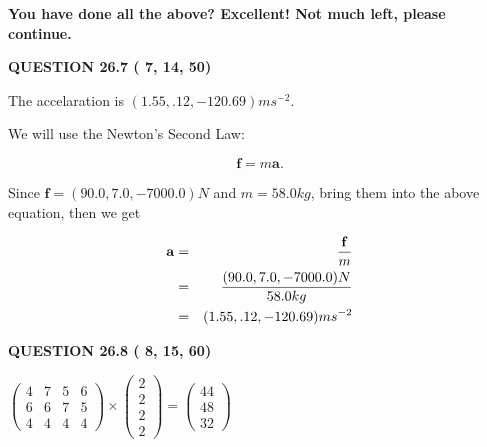 \documentclass[12pt]{article}
\begin{document}
  
 
 
 
 
   
   
\vspace{0.3in}
{\textbf{\LARGE{You have done all the above? Excellent! Not much left, please continue.}}}
\vspace{0.3in}
   
   
  
\vspace{0.2in}
  
{\textbf{\Large{QUESTION
26.7 
 (          7,         14,         50)
}}}
  
  
 
 
\noindent{}
 
 
  The accelaration is $  %
(
1.55,
.12,
-120.69)
ms^{-2} $.
 
 
 
 
 
 
\noindent{}

We will use the Newton's Second Law:
 
\[
\mathbf{f}=m\mathbf{a}.
\]
 
Since $\mathbf{f}= %
(90.0 , 7.0 , -7000.0) N$
and $m= %
58.0kg$, bring them into the above equation, then we get
 
\begin{eqnarray*}
\mathbf{a}&=&\frac{\mathbf{f}}m  \\
&=&\frac{ %
(90.0 , 7.0 , -7000.0) N}{ %
58.0kg}  \\
&=& %
(1.55 , .12 , -120.69) ms^{-2}
\end{eqnarray*}
 
 
 
  
\vspace{0.2in}
  
{\textbf{\Large{QUESTION
26.8 
 (          8,         15,         60)
}}}
  
  
 
 
\noindent{}

 
$\left( \begin{array}{ccccccccccccccc}
           4 & 
           7 & 
           5 & 
           6 \\ 
           6 & 
           6 & 
           7 & 
           5 \\ 
           4 & 
           4 & 
           4 & 
           4
\end{array}\right) \times
\left( \begin{array}{c}
           2 \\ 
           2 \\ 
           2 \\ 
           2
\end{array}\right)  =
\left( \begin{array}{c}
          44 \\ 
          48 \\ 
          32
\end{array}\right)  $
 
\end{document}
